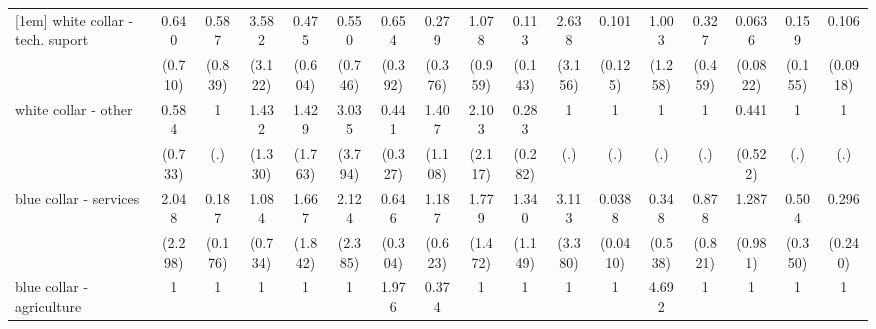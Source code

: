 {\begin{tabular}{l*{16}{c}}
[1em]
white collar - tech. suport&       0.640         &       0.587         &       3.582         &       0.475         &       0.550         &       0.654         &       0.279         &       1.078         &       0.113         &       2.638         &       0.101         &       1.003         &       0.327         &      0.0636\sym{*}  &       0.159         &       0.106\sym{**} \\
                    &     (0.710)         &     (0.839)         &     (3.122)         &     (0.604)         &     (0.746)         &     (0.392)         &     (0.376)         &     (0.959)         &     (0.143)         &     (3.156)         &     (0.125)         &     (1.258)         &     (0.459)         &    (0.0822)         &     (0.155)         &    (0.0918)         \\
[1em]
white collar - other&       0.584         &           1         &       1.432         &       1.429         &       3.035         &       0.441         &       1.407         &       2.103         &       0.283         &           1         &           1         &           1         &           1         &       0.441         &           1         &           1         \\
                    &     (0.733)         &         (.)         &     (1.330)         &     (1.763)         &     (3.794)         &     (0.327)         &     (1.108)         &     (2.117)         &     (0.282)         &         (.)         &         (.)         &         (.)         &         (.)         &     (0.522)         &         (.)         &         (.)         \\
[1em]
blue collar - services&       2.048         &       0.187         &       1.084         &       1.667         &       2.124         &       0.646         &       1.187         &       1.779         &       1.340         &       3.113         &      0.0388\sym{**} &       0.348         &       0.878         &       1.287         &       0.504         &       0.296         \\
                    &     (2.298)         &     (0.176)         &     (0.734)         &     (1.842)         &     (2.385)         &     (0.304)         &     (0.623)         &     (1.472)         &     (1.149)         &     (3.380)         &    (0.0410)         &     (0.538)         &     (0.821)         &     (0.981)         &     (0.350)         &     (0.240)         \\
[1em]
blue collar - agriculture&           1         &           1         &           1         &           1         &           1         &       1.976         &       0.374         &           1         &           1         &           1         &           1         &       4.692         &           1         &           1         &           1         &           1         \\

\end{tabular}}
